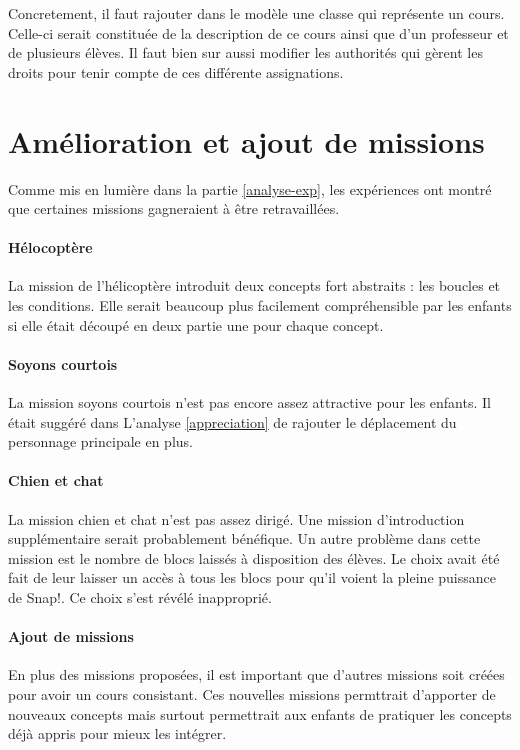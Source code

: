 Concretement, il faut rajouter dans le modèle une classe qui représente un cours. Celle-ci serait constituée de la description de ce cours ainsi que d'un professeur et de plusieurs élèves. Il faut bien sur aussi modifier les authorités qui gèrent les droits pour tenir compte de ces différente assignations.

\section{Amélioration et ajout de missions}
Comme mis en lumière dans la partie \ref{analyse-exp}, les expériences ont montré que certaines missions gagneraient à être retravaillées.

\paragraph{Hélocoptère}
La mission de l'hélicoptère introduit deux concepts fort abstraits : les boucles et les conditions. Elle serait beaucoup plus facilement compréhensible par les enfants si elle était découpé en deux partie une pour chaque concept.

\paragraph{Soyons courtois}
La mission soyons courtois n'est pas encore assez attractive pour les enfants. Il était suggéré dans L'analyse \ref{appreciation} de rajouter le déplacement du personnage principale en plus. %

\paragraph{Chien et chat}
La mission chien et chat n'est pas assez dirigé. Une mission d'introduction supplémentaire serait probablement bénéfique. Un autre problème dans cette mission est le nombre de blocs laissés à disposition des élèves. Le choix avait été fait de leur laisser un accès à tous les blocs pour qu'il voient la pleine puissance de Snap!. Ce choix s'est révélé inapproprié.

\paragraph{Ajout de missions}
En plus des missions proposées, il est important que d'autres missions soit créées pour avoir un cours consistant. Ces nouvelles missions permttrait d'apporter de nouveaux concepts mais surtout permettrait aux enfants de pratiquer les concepts déjà appris pour mieux les intégrer.

